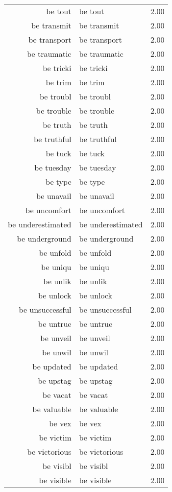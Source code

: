 \begin{table}[ht]
\begin{tabular}{rlr}
  be tout & be tout & 2.00 \\ 
  be transmit & be transmit & 2.00 \\ 
  be transport & be transport & 2.00 \\ 
  be traumatic & be traumatic & 2.00 \\ 
  be tricki & be tricki & 2.00 \\ 
  be trim & be trim & 2.00 \\ 
  be troubl & be troubl & 2.00 \\ 
  be trouble & be trouble & 2.00 \\ 
  be truth & be truth & 2.00 \\ 
  be truthful & be truthful & 2.00 \\ 
  be tuck & be tuck & 2.00 \\ 
  be tuesday & be tuesday & 2.00 \\ 
  be type & be type & 2.00 \\ 
  be unavail & be unavail & 2.00 \\ 
  be uncomfort & be uncomfort & 2.00 \\ 
  be underestimated & be underestimated & 2.00 \\ 
  be underground & be underground & 2.00 \\ 
  be unfold & be unfold & 2.00 \\ 
  be uniqu & be uniqu & 2.00 \\ 
  be unlik & be unlik & 2.00 \\ 
  be unlock & be unlock & 2.00 \\ 
  be unsuccessful & be unsuccessful & 2.00 \\ 
  be untrue & be untrue & 2.00 \\ 
  be unveil & be unveil & 2.00 \\ 
  be unwil & be unwil & 2.00 \\ 
  be updated & be updated & 2.00 \\ 
  be upstag & be upstag & 2.00 \\ 
  be vacat & be vacat & 2.00 \\ 
  be valuable & be valuable & 2.00 \\ 
  be vex & be vex & 2.00 \\ 
  be victim & be victim & 2.00 \\ 
  be victorious & be victorious & 2.00 \\ 
  be visibl & be visibl & 2.00 \\ 
  be visible & be visible & 2.00 \\ 

\end{tabular}
\end{table}
